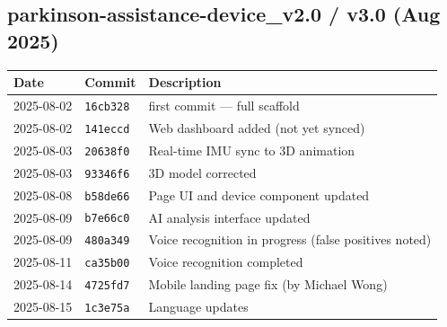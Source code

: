 \documentclass[12pt,a4paper]{article}
\begin{document}
\subsection*{parkinson-assistance-device\_v2.0 / v3.0 (Aug 2025)}
\begin{center}
\begin{tabular}{@{}p{2.5cm} p{2.0cm} p{9.0cm}@{}}
\toprule
\textbf{Date} & \textbf{Commit} & \textbf{Description} \\
\midrule
2025-08-02 & \texttt{16cb328} & first commit --- full scaffold \\
2025-08-02 & \texttt{141eccd} & Web dashboard added (not yet synced) \\
2025-08-03 & \texttt{20638f0} & Real-time IMU sync to 3D animation \\
2025-08-03 & \texttt{93346f6} & 3D model corrected \\
2025-08-08 & \texttt{b58de66} & Page UI and device component updated \\
2025-08-09 & \texttt{b7e66c0} & AI analysis interface updated \\
2025-08-09 & \texttt{480a349} & Voice recognition in progress (false positives noted) \\
2025-08-11 & \texttt{ca35b00} & Voice recognition completed \\
2025-08-14 & \texttt{4725fd7} & Mobile landing page fix (by Michael Wong) \\
2025-08-15 & \texttt{1c3e75a} & Language updates \\
\bottomrule
\end{tabular}
\end{center}
\end{document}
